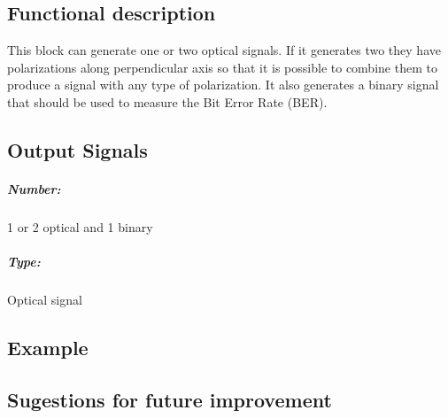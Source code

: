 \documentclass[a4paper]{article}
\begin{document}
\subsection*{Functional description}

This block can generate one or two optical signals. If it generates two they have polarizations along perpendicular axis so that it is possible to combine them to produce a signal with any type of polarization. It also generates a binary signal that should be used to measure the Bit Error Rate (BER). 

\subsection*{Output Signals}

\subparagraph*{Number:} 1 or 2 optical and 1 binary

\subparagraph*{Type:} Optical signal

\subsection*{Example} 

\subsection*{Sugestions for future improvement}
\end{document}
